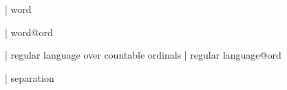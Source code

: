  | word

 | word@ord

 | regular language over countable ordinals
 | regular language@ord

 | separation
